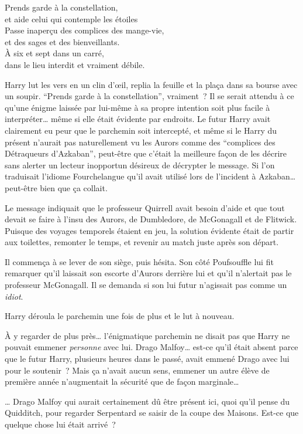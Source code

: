 \begin{writtenNote}
Prends garde à la constellation,\\
et aide celui qui contemple les étoiles
\\
Passe inaperçu des complices des mange-vie,\\
et des sages et des bienveillants.
\\
À six et sept dans un carré,\\
dans le lieu interdit et vraiment débile.
\end{writtenNote}

Harry lut les vers en un clin d'œil, replia la feuille et la plaça dans sa bourse avec un soupir. “Prends garde à la constellation”, vraiment~? Il se serait attendu à ce qu'une énigme laissée par lui-même à sa propre intention soit plus facile à interpréter… même si elle était évidente par endroits. Le futur Harry avait clairement eu peur que le parchemin soit intercepté, et même si le Harry du présent n'aurait pas naturellement vu les Aurors comme des “complices des Détraqueurs d'Azkaban”, peut-être que c'était la meilleure façon de les décrire sans alerter un lecteur inopportun désireux de décrypter le message. Si l'on traduisait l'idiome Fourchelangue qu'il avait utilisé lors de l'incident à Azkaban… peut-être bien que ça collait.

Le message indiquait que le professeur Quirrell avait besoin d'aide et que tout devait se faire à l'insu des Aurors, de Dumbledore, de McGonagall et de Flitwick. Puisque des voyages temporels étaient en jeu, la solution évidente était de partir aux toilettes, remonter le temps, et revenir au match juste après son départ.

Il commença à se lever de son siège, puis hésita. Son côté Poufsouffle lui fit remarquer qu'il laissait son escorte d'Aurors derrière lui et qu'il n'alertait pas le professeur McGonagall. Il se demanda si son lui futur n'agissait pas comme un \emph{idiot}.

Harry déroula le parchemin une fois de plus et le lut à nouveau.

À y regarder de plus près… l'énigmatique parchemin ne disait pas que Harry ne pouvait emmener \emph{personne} avec lui. Drago Malfoy… est-ce qu'il était absent parce que le futur Harry, plusieurs heures dans le passé, avait emmené Drago avec lui pour le soutenir~? Mais ça n'avait aucun sens, emmener un autre élève de première année n'augmentait la sécurité que de façon marginale…

… Drago Malfoy qui aurait certainement dû être présent ici, quoi qu'il pense du Quidditch, pour regarder Serpentard se saisir de la coupe des Maisons. Est-ce que quelque chose lui était arrivé~?

